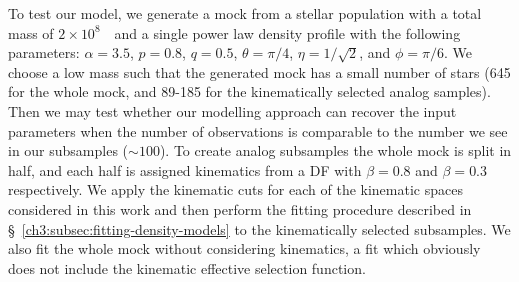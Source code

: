 To test our model, we generate a mock from a stellar population with a total mass of $2\times10^{8}$~\Msun\ and a single power law density profile with the following parameters: $\alpha=3.5$, $p=0.8$, $q=0.5$, $\theta=\pi/4$, $\eta=1/\sqrt{2}$, and $\phi=\pi/6$. We choose a low mass such that the generated mock has a small number of stars (645 for the whole mock, and 89-185 for the kinematically selected \gse analog samples). Then we may test whether our modelling approach can recover the input parameters when the number of observations is comparable to the number we see in our \gse subsamples ($\sim 100$). To create analog \gse subsamples the whole mock is split in half, and each half is assigned kinematics from a DF with $\beta=0.8$ and $\beta=0.3$ respectively. We apply the kinematic cuts for each of the kinematic spaces considered in this work and then perform the fitting procedure described in \S~\ref{ch3:subsec:fitting-density-models} to the kinematically selected subsamples. We also fit the whole mock without considering kinematics, a fit which obviously does not include the kinematic effective selection function. 

